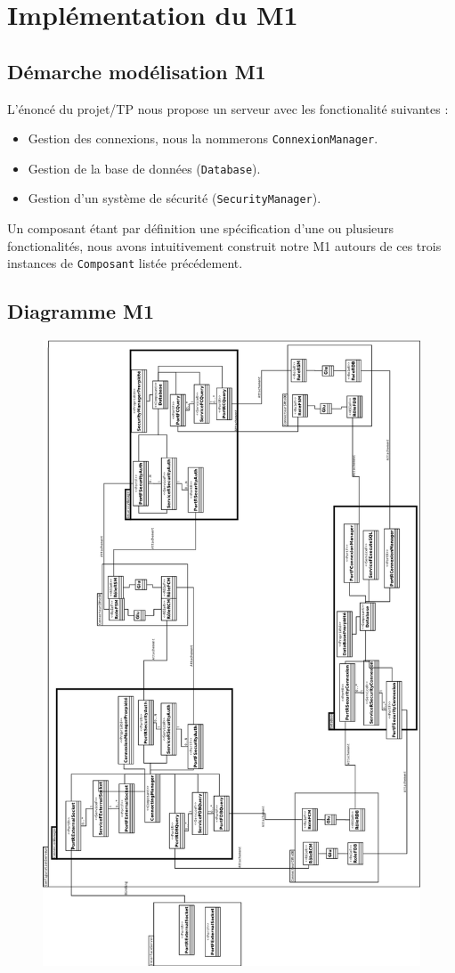 \chapter{Implémentation du M1}
\section{Démarche modélisation M1}
L'énoncé du projet/TP nous propose un serveur avec les fonctionalité suivantes :

\begin{itemize}
\item
  Gestion des connexions, nous la nommerons \verb+ConnexionManager+.
\item 
 Gestion de la base de données (\verb+Database+).
\item
  Gestion d'un système de sécurité (\verb+SecurityManager+).
\end{itemize}

Un composant étant par définition une spécification d'une ou plusieurs fonctionalités, nous avons intuitivement construit notre M1 autours de ces trois instances de \verb+Composant+ listée précédement.


\section{Diagramme M1}
\pagestyle{empty}
\begin{figure}[htb]
\includegraphics[scale=0.20]{img/M11}
\end{figure}
